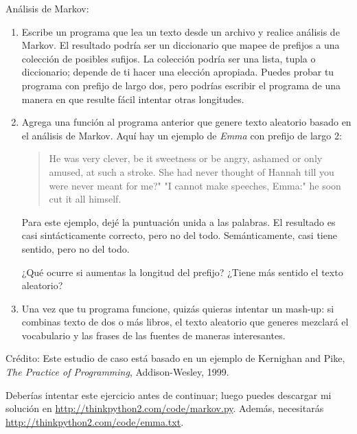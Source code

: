 \documentclass[10pt]{book}
\begin{document}
\begin{exercise}

Análisis de Markov:

\begin{enumerate}

\item Escribe un programa que lea un texto desde un archivo y realice análisis
de Markov.  El resultado podría ser un diccionario que mapee de
prefijos a una colección de posibles sufijos.  La colección
podría ser una lista, tupla o diccionario; depende de ti hacer
una elección apropiada.  Puedes probar tu programa con prefijo
de largo dos, pero podrías escribir el programa de una manera en que resulte
fácil intentar otras longitudes.

\item Agrega una función al programa anterior que genere texto aleatorio
basado en el análisis de Markov.  Aquí hay un ejemplo de {\em Emma}
con prefijo de largo 2:

\begin{quote}
He was very clever, be it sweetness or be angry, ashamed or only
amused, at such a stroke. She had never thought of Hannah till you
were never meant for me?" "I cannot make speeches, Emma:" he soon cut
it all himself.
\end{quote}

Para este ejemplo, dejé la puntuación unida a las palabras.
El resultado es casi sintácticamente correcto, pero no del todo.
Semánticamente, casi tiene sentido, pero no del todo.

¿Qué ocurre si aumentas la longitud del prefijo?  ¿Tiene más sentido
el texto aleatorio?

\item Una vez que tu programa funcione, quizás quieras intentar un mash-up:
si combinas texto de dos o más libros, el texto aleatorio
que generes mezclará el vocabulario y las frases de
las fuentes de maneras interesantes.

\end{enumerate}

Crédito: Este estudio de caso está basado en un ejemplo de Kernighan and
Pike, {\em The Practice of Programming}, Addison-Wesley, 1999.

\end{exercise}

Deberías intentar este ejercicio antes de continuar; luego puedes
descargar mi solución en \url{http://thinkpython2.com/code/markov.py}.
Además, necesitarás \url{http://thinkpython2.com/code/emma.txt}.
\end{document}
